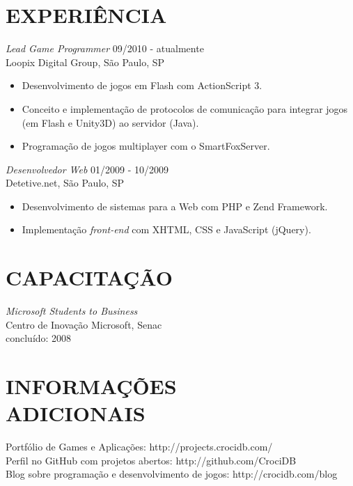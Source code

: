 \documentclass[line,margin]{res}
\begin{document}
\begin{resume}
\section{EXPERIÊNCIA} {\sl Lead Game Programmer} \hfill 09/2010 - atualmente \\
                Loopix Digital Group, São Paulo, SP
                 \begin{itemize}  \itemsep -2pt %
                 \item Desenvolvimento de jogos em Flash com ActionScript 3.
                 \item Conceito e implementação de protocolos de comunicação para integrar jogos (em Flash e Unity3D) ao servidor (Java).
                 \item Programação de jogos multiplayer com o SmartFoxServer.
                 \end{itemize}
 
                {\sl Desenvolvedor Web} \hfill 01/2009 - 10/2009 \\
                Detetive.net, São Paulo, SP
                 \begin{itemize}  \itemsep -2pt %
                 \item Desenvolvimento de sistemas para a Web com PHP e Zend Framework.
                 \item Implementação {\sl front-end} com XHTML, CSS e JavaScript (jQuery).
                 \end{itemize} 

\section{CAPACITAÇÃO}             
           {\sl Microsoft Students to Business} \\
                Centro de Inovação Microsoft, Senac \\
                concluído: 2008 


\section{INFORMAÇÕES \\ ADICIONAIS}             
            Portfólio de Games e Aplicações: http://projects.crocidb.com/ \\
            Perfil no GitHub com projetos abertos: http://github.com/CrociDB \\
            Blog sobre programação e desenvolvimento de jogos: http://crocidb.com/blog
 

\end{resume}
\end{document}
